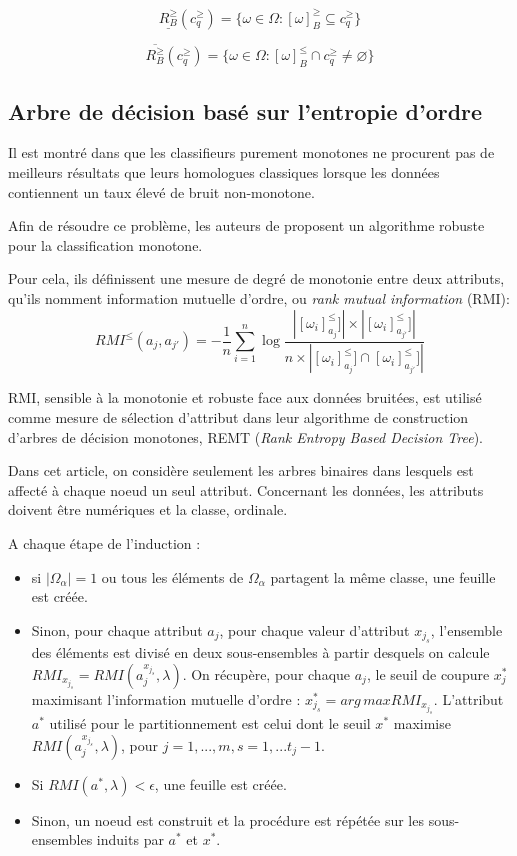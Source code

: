 \documentclass[a4paper]{article}
\begin{document}
$$ \underline{R^{\geq}_B}(c^{\geq}_q) = \{\omega \in \Omega :
[\omega]^{\geq}_B \subseteq c^{\geq}_q\}$$

$$ \overline{R^{\geq}_B}(c^{\geq}_q) = \{\omega \in \Omega :
[\omega]^{\leq}_B \cap c^{\geq}_q \neq \varnothing\}$$


\subsection{Arbre de décision basé sur l'entropie d'ordre}
Il est montré dans \cite{ben-adding} que les classifieurs purement monotones ne
procurent pas de meilleurs résultats que leurs homologues classiques lorsque les
données contiennent un taux élevé de bruit non-monotone. 

Afin de résoudre ce problème, les auteurs de \cite{hu-rank} proposent un algorithme robuste pour la
classification monotone.

Pour cela, ils définissent une mesure de degré de monotonie entre deux
attributs, qu'ils nomment information mutuelle d'ordre, ou
\textit{rank mutual information} (RMI): \\
$$ RMI^{\leq}(a_j, a_{j'}) = -\frac{1}{n} \sum_{i=1}^{n} \log
\frac{|[\omega_i]^{\leq}_{a_j}]| \times |[\omega_i]^{\leq}_{a_{j'}}]|}{n \times
|[\omega_i]^{\leq}_{a_j}]\cap [\omega_i]^{\leq}_{a_{j'}}]|}$$

RMI, sensible à la monotonie et robuste face aux données bruitées, est utilisé
comme mesure de sélection d'attribut dans leur algorithme de construction
d'arbres de décision monotones, REMT (\textit{Rank Entropy Based Decision
Tree}).

Dans cet article, on considère seulement les arbres binaires dans lesquels
est affecté à chaque noeud un seul attribut. Concernant les données, les
attributs doivent être numériques et la classe, ordinale.


\noindent A chaque étape de l'induction :
\begin{itemize}
    \item si $|\Omega_{\alpha}| = 1$ ou tous les éléments
de $\Omega_{\alpha}$ partagent la même classe, une feuille est créée. 
    \item Sinon, pour chaque attribut $a_j$, pour chaque valeur d'attribut $x_{j_s}$, l'ensemble
des éléments est divisé en deux sous-ensembles à partir desquels on calcule
$RMI_{x_{j_s}} = RMI(a^{x_{j_s}}_j, \lambda)$. On récupère, pour chaque $a_j$,
le seuil de coupure $x^*_j$ maximisant l'information mutuelle d'ordre :
$x^*_{j_s} = arg\,max RMI_{x_{j_s}}.$ L'attribut $a^*$ utilisé pour le
partitionnement est celui dont le seuil $x^*$ maximise
$RMI(a^{x_{j_s}}_j,\lambda)$, pour $j=1,...,m, s=1,...t_j-1.$ 
    \item Si $RMI(a^*,
\lambda) < \epsilon$, une feuille est créée. 
    \item Sinon, un noeud est construit et la
procédure est répétée sur les sous-ensembles induits par $a^*$ et $x^*$. \\
\end{itemize}
\end{document}
